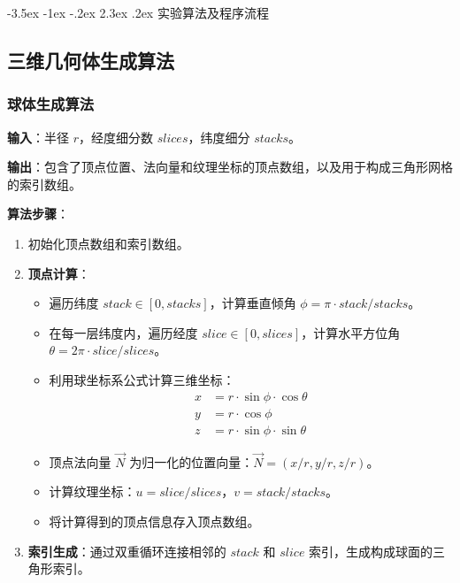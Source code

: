 \documentclass[12pt,a4paper]{article}
\makeatletter
\renewcommand\section{\@startsection{section}{1}{\z@}%
    {-3.5ex \@plus -1ex \@minus -.2ex}%
    {2.3ex \@plus.2ex}%
    {\normalfont\Large\bfseries\songti}}
\makeatother
\begin{document}
\section{实验算法及程序流程}
\begin{tcolorbox}
\subsection{三维几何体生成算法}

\subsubsection{球体生成算法}

\textbf{输入}：半径 $r$，经度细分数 $slices$，纬度细分 $stacks$。

\textbf{输出}：包含了顶点位置、法向量和纹理坐标的顶点数组，以及用于构成三角形网格的索引数组。

\textbf{算法步骤}：
\begin{enumerate}
    \item 初始化顶点数组和索引数组。
    \item \textbf{顶点计算}：
    \begin{itemize}
        \item 遍历纬度 $stack \in [0, stacks]$，计算垂直倾角 $\phi = \pi \cdot stack / stacks$。
        \item 在每一层纬度内，遍历经度 $slice \in [0, slices]$，计算水平方位角 $\theta = 2\pi \cdot slice / slices$。
        \item 利用球坐标系公式计算三维坐标：
        \begin{align*}
        x &= r \cdot \sin\phi \cdot \cos\theta \\
        y &= r \cdot \cos\phi \\
        z &= r \cdot \sin\phi \cdot \sin\theta
        \end{align*}
        \item 顶点法向量 $\vec{N}$ 为归一化的位置向量：$\vec{N} = (x/r, y/r, z/r)$。
        \item 计算纹理坐标：$u = slice / slices$，$v = stack / stacks$。
        \item 将计算得到的顶点信息存入顶点数组。
    \end{itemize}
    \item \textbf{索引生成}：通过双重循环连接相邻的 $stack$ 和 $slice$ 索引，生成构成球面的三角形索引。
\end{enumerate}


\end{tcolorbox}
\end{document}
